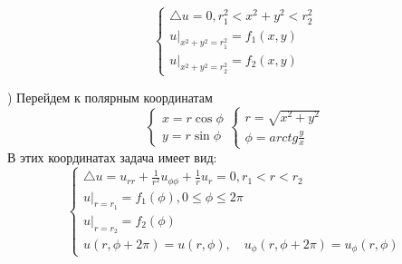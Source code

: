 $$\begin{cases}
	\triangle u = 0,  r_1^2 < x^2 + y^2 < r_2^2\\
	u|_{x^2 + y^2 = r_1^2} = f_1 (x, y)\\
	u|_{x^2 + y^2 = r_2^2} = f_2 (x, y)
\end{cases}$$
\begin{solution}
	\hfill{}) Перейдем к полярным координатам 
	$$\begin{cases}
		x = r \cos \phi \\
		y = r \sin \phi 
	\end{cases} \begin{cases}
		r = \sqrt{x^2 + y^2} \\
		\phi = arctg \frac{y}{x}
	\end{cases}$$
	В этих координатах задача имеет вид:
	$$\begin{cases}
		\triangle u = u_{rr} + \frac{1}{r^2} u_{\phi \phi} + \frac{1}{r} u_r = 0,  r_1 < r < r_2\\
		u|_{r= r_1} = f_1 (\phi), 0 \leq \phi \leq 2 \pi \\
		u|_{r = r_2} = f_2 (\phi) \\
		u(r, \phi + 2 \pi) = u(r, \phi), \quad u_{\phi} (r, \phi + 2 \pi) = u_{\phi} (r, \phi)
	\end{cases}$$


\end{solution}
